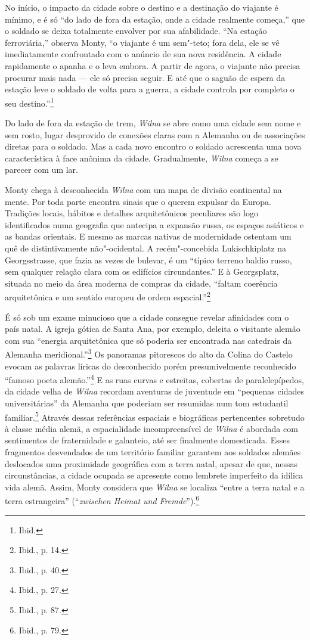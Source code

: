 No início, o impacto da cidade sobre o destino e a destinação do
viajante é mínimo, e é só ``do lado de fora da estação, onde a cidade
realmente começa,'' que o soldado se deixa totalmente envolver por sua
afabilidade. ``Na estação ferroviária,'' observa Monty, ``o viajante é
um sem"-teto; fora dela, ele se vê imediatamente confrontado com o
anúncio de sua nova residência. A cidade rapidamente o apanha e o leva
embora. A partir de agora, o viajante não precisa procurar mais nada ---
ele só precisa seguir. E até que o saguão de espera da estação leve o
soldado de volta para a guerra, a cidade controla por completo o seu
destino.''\footnote{Ibid.}

Do lado de fora da estação de trem, \textit{Wilna} se abre como uma cidade sem
nome e sem rosto, lugar desprovido de conexões claras com a Alemanha ou
de associações diretas para o soldado. Mas a cada novo encontro o
soldado acrescenta uma nova característica à face anônima da cidade.
Gradualmente, \textit{Wilna} começa a se parecer com um lar.

Monty chega à desconhecida \textit{Wilna} com um mapa de divisão continental na
mente. Por toda parte encontra sinais que o querem expulsar da Europa.
Tradições locais, hábitos e detalhes arquitetônicos peculiares são logo
identificados numa geografia que antecipa a expansão russa, os espaços
asiáticos e as bandas orientais. E mesmo as marcas nativas de
modernidade ostentam um quê de distintivamente não"-ocidental. A
recém"-concebida Lukischkiplatz na Georgsstrasse, que fazia as vezes de
bulevar, é um ``típico terreno baldio russo, sem qualquer relação clara
com os edifícios circundantes.'' E à Georgsplatz, situada no meio da
área moderna de compras da cidade, ``faltam coerência arquitetônica e um
sentido europeu de ordem espacial.''\footnote{Ibid., p. 14.}

É só sob um exame minucioso que a cidade consegue revelar afinidades com
o país natal. A igreja gótica de Santa Ana, por exemplo, deleita o
visitante alemão com sua ``energia arquitetônica que só poderia ser
encontrada nas catedrais da Alemanha meridional.''\footnote{Ibid., p. 40.} Os panoramas pitorescos do alto da Colina do Castelo evocam as palavras líricas do desconhecido porém presumivelmente reconhecido
``famoso poeta alemão.''\footnote{Ibid., p. 27.} E as ruas curvas e
estreitas, cobertas de paralelepípedos, da cidade velha de \textit{Wilna}
recordam aventuras de juventude em ``pequenas cidades universitárias''
da Alemanha que poderiam ser resumidas num tom estudantil
familiar.\footnote{Ibid., p. 87.} Através dessas referências espaciais e
biográficas pertencentes sobretudo à classe média alemã, a espacialidade
incompreensível de \textit{Wilna} é abordada com sentimentos de fraternidade e
galanteio, até ser finalmente domesticada. Esses fragmentos desvendados
de um território familiar garantem aos soldados alemães deslocados uma
proximidade geográfica com a terra natal, apesar de que, nessas
circunstâncias, a cidade ocupada se apresente como lembrete imperfeito
da idílica vida alemã. Assim, Monty considera que \textit{Wilna} se localiza
``entre a terra natal e a terra estrangeira'' (``\textit{zwischen Heimat
und Fremde}'').\footnote{Ibid., p. 79.}

